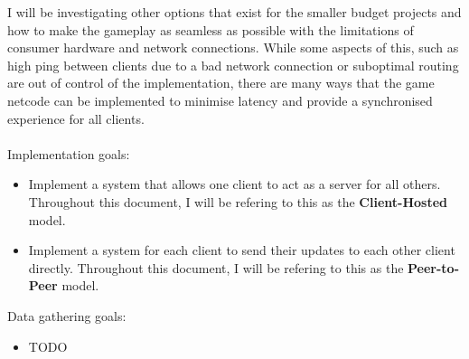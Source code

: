 I will be investigating other options that exist for the smaller budget projects and how to make the gameplay as seamless as possible with the limitations of consumer hardware and network connections. While some aspects of this, such as high ping between clients due to a bad network connection or suboptimal routing are out of control of the implementation, there are many ways that the game netcode can be implemented to minimise latency and provide a synchronised experience for all clients.
\\
\\
Implementation goals:
\begin{itemize}
\item Implement a system that allows one client to act as a server for all others. Throughout this document, I will be refering to this as the \textbf{Client-Hosted} model.
\item Implement a system for each client to send their updates to each other client directly. Throughout this document, I will be refering to this as the \textbf{Peer-to-Peer} model.
\end{itemize}
Data gathering goals:
\begin{itemize}
\item TODO
\end{itemize}

\newpage

